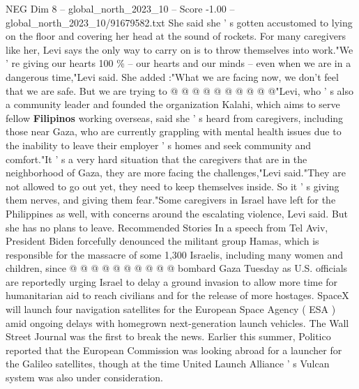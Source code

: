\begin{textsample}{NEG Dim 8 – global\_north\_2023\_10 – Score -1.00 – global\_north\_2023\_10/91679582.txt}
She said she ' s gotten accustomed to lying on the floor and covering her head at the sound of rockets.
For many caregivers like her, Levi says the only way to carry on is to throw themselves into work."We ' re giving our hearts 100 \% -- our hearts and our minds -- even when we are in a dangerous time,"Levi said.
She added :"What we are facing now, we don't feel that we are safe.
But we are trying to @ @ @ @ @ @ @ @ @ @"Levi, who ' s also a community leader and founded the organization Kalahi, which aims to serve fellow \textbf{Filipinos} working overseas, said she ' s heard from caregivers, including those near Gaza, who are currently grappling with mental health issues due to the inability to leave their employer ' s homes and seek community and comfort."It ' s a very hard situation that the caregivers that are in the neighborhood of Gaza, they are more facing the challenges,"Levi said."They are not allowed to go out yet, they need to keep themselves inside.
So it ' s giving them nerves, and giving them fear."Some caregivers in Israel have left for the Philippines as well, with concerns around the escalating violence, Levi said.
But she has no plans to leave.
Recommended Stories In a speech from Tel Aviv, President Biden forcefully denounced the militant group Hamas, which is responsible for the massacre of some 1,300 Israelis, including many women and children, since @ @ @ @ @ @ @ @ @ @ bombard Gaza Tuesday as U.S. officials are reportedly urging Israel to delay a ground invasion to allow more time for humanitarian aid to reach civilians and for the release of more hostages.
SpaceX will launch four navigation satellites for the European Space Agency ( ESA ) amid ongoing delays with homegrown next-generation launch vehicles.
The Wall Street Journal was the first to break the news.
Earlier this summer, Politico reported that the European Commission was looking abroad for a launcher for the Galileo satellites, though at the time United Launch Alliance ' s Vulcan system was also under consideration.

\end{textsample}
